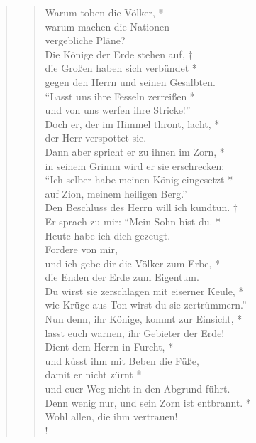 \begin{quote}
\begin{verse}
\smallskip

Warum toben die Völker, *\\
warum machen die Nationen\\
vergebliche Pläne?\\
\vin Die Könige der Erde stehen auf, †\\ 
\vin die Großen haben sich verbündet *\\
\vin gegen den Herrn und seinen Gesalbten.\\
``Lasst uns ihre Fesseln zerreißen *\\
und von uns werfen ihre Stricke!'' \\
\vin Doch er, der im Himmel thront, lacht, *\\
\vin der Herr verspottet sie. \\
Dann aber spricht er zu ihnen im Zorn, *\\
in seinem Grimm wird er sie erschrecken: \\
\vin ``Ich selber habe meinen König eingesetzt *\\
\vin auf Zion, meinem heiligen Berg.''\\
Den Beschluss des Herrn will ich kundtun. †\\ 
Er sprach zu mir: ``Mein Sohn bist du. *\\
Heute habe ich dich gezeugt.\\
\vin Fordere von mir,\\
\vin und ich gebe dir die Völker zum Erbe, *\\
\vin die Enden der Erde zum Eigentum.\\
Du wirst sie zerschlagen mit eiserner Keule, *\\
wie Krüge aus Ton wirst du sie zertrümmern.''\\
\vin Nun denn, ihr Könige, kommt zur Einsicht, *\\
\vin lasst euch warnen, ihr Gebieter der Erde!\\
Dient dem Herrn in Furcht, *\\
und küsst ihm mit Beben die Füße,\\
\vin damit er nicht zürnt *\\
\vin und euer Weg nicht in den Abgrund führt.\\
Denn wenig nur, und sein Zorn ist entbrannt. *\\
Wohl allen, die ihm vertrauen!\\!

\end{verse}

\begin{verse}


\end{verse}
\end{quote}
